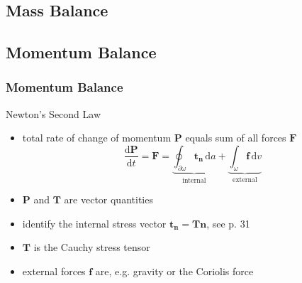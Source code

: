 \documentclass[hide notes,intlimits]{beamer}
\begin{document}
\subsection{Mass Balance}



\subsection{Momentum Balance}

\begin{frame}
  \frametitle{Momentum Balance}
  Newton's Second Law
  \begin{itemize}
    \item total rate of change of momentum $\mathbf{P}$ equals sum of all forces $\mathbf{F}$
    \begin{equation}
      \frac{\text{d} \mathbf{P}}{\text{d} t} = \mathbf{F} = \underbrace{\oint_{\partial \omega} \mathbf{t}_{\mathbf{n}} \, \text{d} a}_{\text{internal}} +\underbrace{\int_{\omega} \mathbf{f} \, \text{d} v}_{\text{external}}
    \end{equation}
    \item $\mathbf{P}$ and $\mathbf{T}$ are vector quantities
  \item identify the internal stress vector $\mathbf{t}_{\mathbf{n}} = \mathbf{T}\mathbf{n}$, see p. 31
  \item $\mathbf{T}$ is the \alert{Cauchy stress tensor}
  \item external forces $\mathbf{f}$ are, e.g. gravity or the Coriolis force
  \end{itemize}    
\end{frame}
\end{document}
